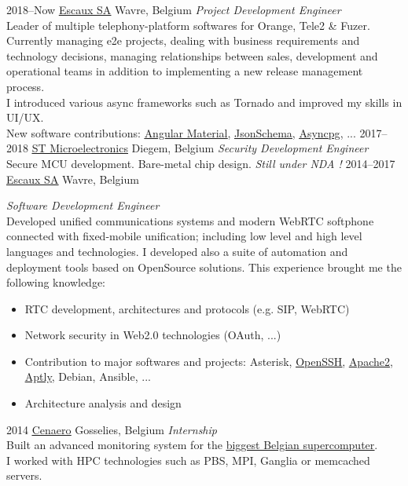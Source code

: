 \documentclass[]{friggeri-cv} %
\begin{document}
\begin{entrylist}
\entry
{2018--Now}
{\href{http://escaux.com}{\ul{Escaux SA}}}
{Wavre, Belgium}
{\emph{Project Development Engineer} \\
Leader of multiple telephony-platform softwares for Orange, Tele2 \& Fuzer. Currently managing e2e projects, dealing with business requirements and technology decisions, managing relationships between sales, development and operational teams in addition to implementing a new release management process. \\
I introduced various async frameworks such as Tornado and improved my skills in UI/UX. \\
New software contributions: \href{https://github.com/angular/components/issues/13862}{\ul{Angular Material}}, \href{https://github.com/Julian/jsonschema/issues/499}{\ul{JsonSchema}}, \href{https://github.com/MagicStack/asyncpg/issues/359}{\ul{Asyncpg}}, ...
}
\entry
{2017--2018}
{\href{https://www.st.com}{\ul{ST Microelectronics}}}
{Diegem, Belgium}
{\emph{Security Development Engineer} \\
Secure MCU development. Bare-metal chip design. \emph{Still under NDA !}
}
\entry
{2014--2017}
{\href{http://escaux.com}{\ul{Escaux SA}}}
{Wavre, Belgium}
{\emph{Software Development Engineer} \\
Developed unified communications systems and modern WebRTC softphone connected with fixed-mobile unification; including low level and high level languages and technologies. I developed also a suite of automation and deployment tools based on OpenSource solutions. This experience brought me the following knowledge:
\begin{itemize}
\item RTC development, architectures and protocols (e.g. SIP, WebRTC)
\item Network security in Web2.0 technologies (OAuth, ...)
\item Contribution to major softwares and projects: Asterisk, \href{http://lists.mindrot.org/pipermail/openssh-unix-dev/2016-December/035563.html}{\ul{OpenSSH}}, \href{https://github.com/rmedaer/mod_psm}{\ul{Apache2}}, \href{https://github.com/smira/aptly/pull/390}{\ul{Aptly}}, Debian, Ansible, ...
\item Architecture analysis and design
\end{itemize}}
\entry
{2014}
{\href{http://www.cenaero.be/}{\ul{Cenaero}}}
{Gosselies, Belgium}
{\emph{Internship} \\
Built an advanced monitoring system for the \href{https://www.top500.org/system/178439}{\ul{biggest Belgian supercomputer}}. \\
I worked with HPC technologies such as PBS, MPI, Ganglia or memcached servers.}
\end{entrylist}
\end{document}
